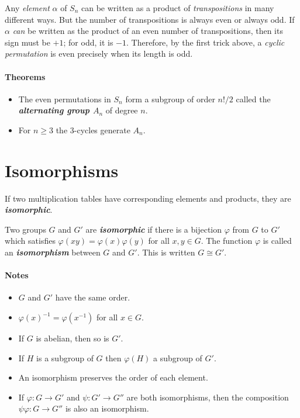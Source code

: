 \documentclass[a4paper,twocolumn,10pt]{article}
\begin{document}
  Any \textit{element} $\alpha$ of $S_n$ can be written as a product of
  \textit{transpositions} in many different ways. But the number of
  transpositions is always even or always odd. If $\alpha$ \textit{can} be
  written as the product of an even number of transpositions, then its sign
  must be $+1$; for odd, it is $-1$. Therefore, by the first trick above, a
  \textit{cyclic permutation} is even precisely when its length is odd.

  \paragraph{Theorems}
  \begin{itemize}[leftmargin=0.45in]
    \item[\theorem{6.4}] The even permutations in $S_n$ form a subgroup of
      order $n!/2$ called the \textbf{\textit{alternating group $A_n$}} of
      degree $n$.

    \item[\theorem{6.5}] For $n\geqslant 3$ the 3-cycles generate $A_n$.
  \end{itemize}

  \section{Isomorphisms}
  If two multiplication tables have corresponding elements and products, they
  are \textbf{\textit{isomorphic}}.

  Two groups $G$ and $G'$ are \textbf{\textit{isomorphic}} if there is a
  bijection $\varphi$ from $G$ to $G'$ which satisfies $\varphi(xy) =
  \varphi{(x)}\varphi{(y)}$ for all $x,y \in G$. The function $\varphi$ is called an
  \textbf{\textit{isomorphism}} between $G$ and $G'$.
  This is written $G \cong G'$.

  \paragraph{Notes}
  \begin{itemize}
    \item $G$ and $G'$ have the same order.
    \item $\varphi{(x)}^{-1} = \varphi{(x^{-1})}$ for all $x \in G$.
    \item If $G$ is abelian, then so is $G'$.
    \item If $H$ is a subgroup of $G$ then $\varphi{(H)}$ a subgroup of $G'$.
    \item An isomorphism preserves the order of each element.
    \item If $\varphi\colon G \rightarrow G'$ and $\psi\colon G' \rightarrow G''$ are both
      isomorphisms, then the composition $\psi\varphi\colon G \rightarrow G''$ is also
      an isomorphism.
  \end{itemize}
\end{document}
